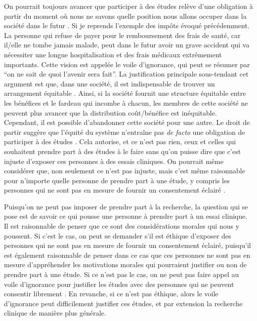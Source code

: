 \documentclass[
  12pt,
]{book}
\begin{document}
On pourrait toujours avancer que participer à des études relève d'une obligation à partir du moment où nous ne savons quelle position nous allons occuper dans la société dans le futur \citep{Rawls99}. Si je reprends l'exemple des impôts évoqué précédemment. La personne qui refuse de payer pour le remboursement des frais de santé, car il/elle ne tombe jamais malade, peut dans le futur avoir un grave accident qui va nécessiter une longue hospitalisation et des frais médicaux extrêmement importants. Cette vision est appelée le voile d'ignorance, qui peut se résumer par ``on ne sait de quoi l'avenir sera fait''. La justification principale sous-tendant cet argument est que, dans une société, il est indispensable de trouver un arrangement équitable \citep{Rawls99}. Ainsi, si la société fournit une structure équitable entre les bénéfices et le fardeau qui incombe à chacun, les membres de cette société ne peuvent plus avancer que la distribution coût/bénéfice est inéquitable. Cependant, il est possible d'abandonner cette société pour une autre. Le droit de partir suggère que l'équité du système n'entraîne pas \emph{de facto} une obligation de participer à des études \citep{sep-clinical-research}. Cela autorise, et ce n'est pas rien, ceux et celles qui souhaitent prendre part à des études à le faire sans qu'on puisse dire que c'est injuste d'exposer ces personnes à des essais cliniques. On pourrait même considérer que, non seulement ce n'est pas injuste, mais c'est même raisonnable pour n'importe quelle personne de prendre part à une étude, y compris les personnes qui ne sont pas en mesure de fournir un consentement éclairé \citep{sep-clinical-research}.

Puisqu'on ne peut pas imposer de prendre part à la recherche, la question qui se pose est de savoir ce qui pousse une personne à prendre part à un essai clinique. Il est raisonnable de penser que ce sont des considérations morales qui nous y poussent. Si c'est le cas, on peut se demander s'il est éthique d'exposer des personnes qui ne sont pas en mesure de fournir un consentement éclairé, puisqu'il est également raisonnable de penser dans ce cas que ces personnes ne sont pas en mesure d'appréhender les motivations morales qui pourraient justifier ou non de prendre part à une étude. Si ce n'est pas le cas, on ne peut pas faire appel au voile d'ignorance pour justifier les études avec des personnes qui ne peuvent consentir librement \citep{sep-clinical-research}. En revanche, si ce n'est pas éthique, alors le voile d'ignorance peut difficilement justifier ces études, et par extension la recherche clinique de manière plus générale.
\end{document}
